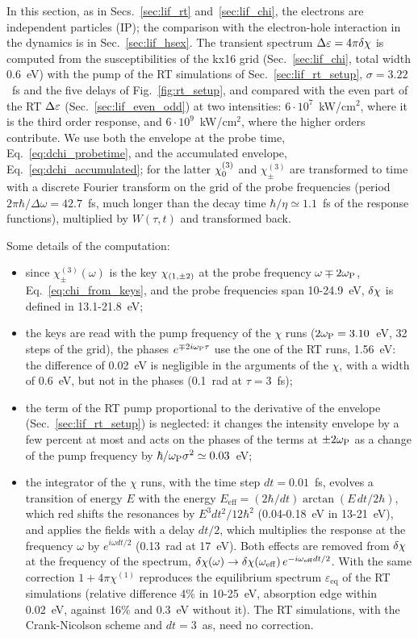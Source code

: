 \documentclass[10pt,a4paper]{paper}
\begin{document}
In this section, as in Secs.~\ref{sec:lif_rt} and~\ref{sec:lif_chi}, the electrons are independent particles (IP);
the comparison with the electron-hole interaction in the dynamics is in Sec.~\ref{sec:lif_hsex}.
The transient spectrum $\Delta\varepsilon = 4\pi\delta\chi$ is computed from the susceptibilities of the kx16 grid (Sec.~\ref{sec:lif_chi},
total width 0.6~eV) with the pump of the RT simulations of Sec.~\ref{sec:lif_rt_setup}, $\sigma = 3.22$~fs and the five
delays of Fig.~\ref{fig:rt_setup}, and compared with the even part of the RT $\Delta\varepsilon$ (Sec.~\ref{sec:lif_even_odd}) at
two intensities: $6\cdot10^7$~kW/cm$^2$, where it is the third order response, and $6\cdot10^9$~kW/cm$^2$, where the
higher orders contribute. We use both the envelope at the probe time, Eq.~\eqref{eq:dchi_probetime}, and the
accumulated envelope, Eq.~\eqref{eq:dchi_accumulated}; for the latter $\chi^{(3)}_{0}$ and $\chi^{(3)}_\pm$ are transformed to
time with a discrete Fourier transform on the grid of the probe frequencies (period $2\pi\hbar/\Delta\omega = 42.7$~fs,
much longer than the decay time $\hbar/\eta\simeq1.1$~fs of the response functions), multiplied by $W(\tau,t)$ and
transformed back.

Some details of the computation:
\begin{itemize}
\item since $\chi^{(3)}_\pm(\omega)$ is the key $\chi_{(1,\pm2)}$ at the probe frequency $\omega\mp2\omega_{\mathrm{P}}$,
Eq.~\eqref{eq:chi_from_keys}, and the probe frequencies span 10-24.9~eV, $\delta\chi$ is defined in 13.1-21.8~eV;
\item the keys are read with the pump frequency of the $\chi$ runs ($2\omega_{\mathrm{P}} = 3.10$~eV, 32 steps of the grid), the phases
$e^{\mp2i\omega_{\mathrm{P}}\tau}$ use the one of the RT runs, 1.56~eV: the difference of 0.02~eV is negligible in the arguments of the
$\chi$, with a width of 0.6~eV, but not in the phases (0.1~rad at $\tau = 3$~fs);
\item the term of the RT pump proportional to the derivative of the envelope (Sec.~\ref{sec:lif_rt_setup}) is
neglected: it changes the intensity envelope by a few percent at most and acts on the phases of the terms at
$\pm2\omega_{\mathrm{P}}$ as a change of the pump frequency by $\hbar/\omega_{\mathrm{P}}\sigma^2\simeq0.03$~eV;
\item the integrator of the $\chi$ runs, with the time step $dt = 0.01$~fs, evolves a transition of energy $E$ with the
energy $E_{\mathrm{eff}} = (2\hbar/dt)\arctan(E\,dt/2\hbar)$, which red shifts the resonances by
$E^3dt^2/12\hbar^2$ (0.04-0.18~eV in 13-21~eV), and applies the fields with a delay $dt/2$, which multiplies the
response at the frequency $\omega$ by $e^{i\omega dt/2}$ (0.13~rad at 17~eV). Both effects are removed from $\delta\chi$
at the frequency of the spectrum, $\delta\chi(\omega)\to\delta\chi(\omega_{\mathrm{eff}})\,e^{-i\omega_{\mathrm{eff}}dt/2}$. With
the same correction $1+4\pi\chi^{(1)}$ reproduces the equilibrium spectrum $\varepsilon_{\mathrm{eq}}$ of the RT
simulations (relative difference 4\% in 10-25~eV, absorption edge within 0.02~eV, against 16\% and 0.3~eV without
it). The RT simulations, with the Crank-Nicolson scheme and $dt = 3$~as, need no correction.
\end{itemize}
\end{document}

